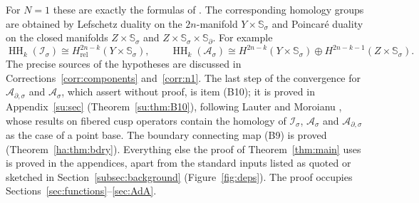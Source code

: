 \documentclass[11pt,oneside,reqno]{article}
\DeclareMathOperator{\HH}{HH}
\newcommand{\Is}{\mathcal I_\sigma}
\newcommand{\As}{\mathcal A_\sigma}
\newcommand{\Ads}{\mathcal A_{\partial,\sigma}}
\newcommand{\Ssig}{\mathbb S_\sigma}
\newcommand{\Sd}{\mathbb S_\partial}
\newcommand{\Hrel}{H_{\mathrm{rel}}}
\theoremstyle{plain}
\theoremstyle{definition}
\theoremstyle{remark}
\begin{document}
For \(N=1\) these are exactly the formulas of \cite[(16)]{MN}. The
corresponding homology groups are obtained by Lefschetz duality on the
\(2n\)-manifold \(Y\times\Ssig\) and Poincar\'e duality on the closed
manifolds \(Z\times\Ssig\) and \(Z\times\Ssig\times\Sd\). For example
\cite[Props.~2, 3]{MN}
\[
 \HH_k(\Is)\cong\Hrel^{2n-k}(Y\times\Ssig),\qquad
 \HH_k(\As)\cong H^{2n-k}(Y\times\Ssig)\oplus H^{2n-k-1}(Z\times\Ssig).
\]
The precise sources of the hypotheses are discussed in
Corrections~\ref{corr:components} and~\ref{corr:n1}. The last step of
the convergence for \(\Ads\) and \(\As\), which \cite{MN} assert without
proof, is item (B10); it is proved in Appendix~\ref{su:sec}
(Theorem~\ref{su:thm:B10}), following Lauter and Moroianu
\cite{LauterMoroianu}, whose results on fibered cusp operators contain
the homology of \(\Is\), \(\As\) and \(\Ads\) as the case of a point base.
The boundary connecting map (B9) is proved (Theorem~\ref{ha:thm:bdry}).
Everything else the proof of Theorem~\ref{thm:main} uses is proved in
the appendices, apart from the standard inputs listed as quoted or
sketched in Section~\ref{subsec:background} (Figure~\ref{fig:deps}).
The proof occupies
Sections~\ref{sec:functions}--\ref{sec:AdA}.
\end{document}
